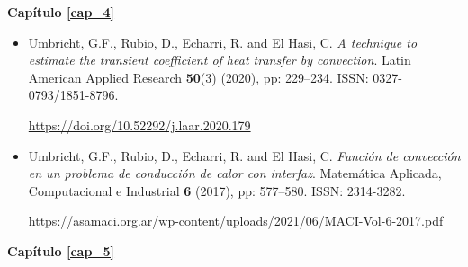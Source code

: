 {\bf Cap\'itulo \ref{cap_4}} 

\begin{itemize}

%
\item{Umbricht, G.F., Rubio, D., Echarri, R. and El Hasi, C. {\em A technique to estimate the transient coefficient of heat transfer by convection}. Latin American Applied Research {\bf 50}(3) (2020), pp: 229--234. ISSN: 0327-0793/1851-8796.}

\sloppy
\url{https://doi.org/10.52292/j.laar.2020.179}
%
%
\item{Umbricht, G.F., Rubio, D., Echarri, R. and El Hasi, C. {\em Funci\'on de convecci\'on en un problema de conducci\'on de calor con interfaz}. Matem\'atica Aplicada, Computacional e Industrial {\bf 6} (2017), pp: 577--580. ISSN: 2314-3282.}

\sloppy
\url{https://asamaci.org.ar/wp-content/uploads/2021/06/MACI-Vol-6-2017.pdf}
%
\end{itemize}

{\bf Cap\'itulo \ref{cap_5}} 

